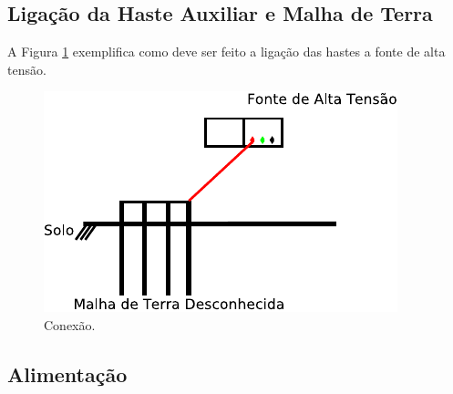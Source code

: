 \documentclass[a4paper, 10pt]{article}
\begin{document}
\subsection{Ligação da Haste Auxiliar e Malha de Terra}

A Figura \ref{fig_conexao_modo1} exemplifica como deve ser feito a ligação das hastes 
a fonte de alta tensão. 

\begin{figure}[!h]
        \caption{\label{fig_conexao_modo1}Conexão.}
	    \begin{center}
            \includegraphics[scale=1.2]{../fotos/conexoes/hastes_modo_1.pdf}
	    \end{center}
\end{figure}






\newpage
\subsection{Alimentação}
\label{sec_alimentacao}
\end{document}
